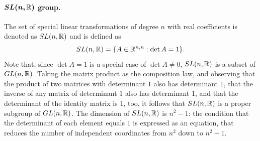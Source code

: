 \paragraph{$\bm{SL(n,\mathbb{R})}$ group.} The set of special linear transformations of degree $n$ with real coefficients is denoted as $SL(n, \mathbb{R})$ and is defined as
    \begin{equation}
        SL(n, \mathbb{R}) = \{ A \in \mathbb{R}^{n,n} : \det A = 1 \}.
    \end{equation}
    Note that, since $\det A = 1$ is a special case of $\det A \neq 0$, $SL(n, \mathbb{R})$ is a subset of $GL(n, \mathbb{R})$. Taking the matrix product as the composition law, and observing that the product of two matrices with determinant $1$ also has determinant $1$, that the inverse of any matrix of determinant $1$ also has determinant $1$, and that the determinant of the identity matrix is $1$, too, it follows that $SL(n, \mathbb{R})$ is a proper subgroup of $GL(n, \mathbb{R})$. The dimension of $SL(n, \mathbb{R})$ is $n^2 - 1$: the condition that the determinant of each element equals $1$ is expressed as an equation, that reduces the number of independent coordinates from $n^2$ down to $n^2 - 1$.

